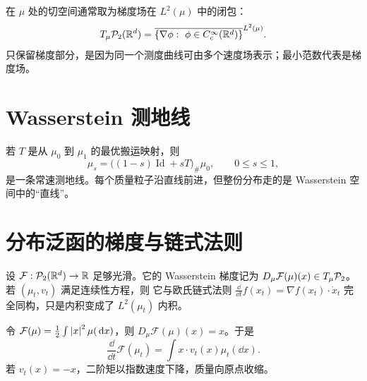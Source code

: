 \begin{definition}
在 $\mu$ 处的切空间通常取为梯度场在 $L^2(\mu)$ 中的闭包：
\[
T_\mu\mathcal{P}_2(\mathbb{R}^d)
=\overline{\{\nabla\phi:\ \phi\in C_c^\infty(\mathbb{R}^d)\}}^{L^2(\mu)}.
\]
只保留梯度部分，是因为同一个测度曲线可由多个速度场表示；最小范数代表是梯度场。
\end{definition}

\section{Wasserstein 测地线}

若 $T$ 是从 $\mu_0$ 到 $\mu_1$ 的最优搬运映射，则
\[
\mu_s=\bigl((1-s)\operatorname{Id}+sT\bigr)_\#\mu_0,
\qquad 0\le s\le1,
\]
是一条常速测地线。每个质量粒子沿直线前进，但整份分布走的是 Wasserstein 空间中的“直线”。

\begin{center}
\end{center}

\section{分布泛函的梯度与链式法则}

设 $\mathcal F:\mathcal{P}_2(\mathbb{R}^d)\to\mathbb{R}$ 足够光滑。它的 Wasserstein 梯度记为 $D_\mu\mathcal F(\mu)(x)\in T_\mu\mathcal{P}_2$。若 $(\mu_t,v_t)$ 满足连续性方程，则
它与欧氏链式法则 $\frac{\dd}{\dd t}f(x_t)=\nabla f(x_t)\cdot\dot x_t$ 完全同构，只是内积变成了 $L^2(\mu_t)$ 内积。

\begin{examplebox}[二阶矩泛函]
令 $\mathcal F(\mu)=\tfrac12\int\left\lvert x\right\rvert^2\mu(\,\mathrm{d} x)$，则 $D_\mu\mathcal F(\mu)(x)=x$。于是
\[
\frac{\dd}{\dd t}\mathcal F(\mu_t)=\int x\cdot v_t(x)\mu_t(\dd x).
\]
若 $v_t(x)=-x$，二阶矩以指数速度下降，质量向原点收缩。
\end{examplebox}

